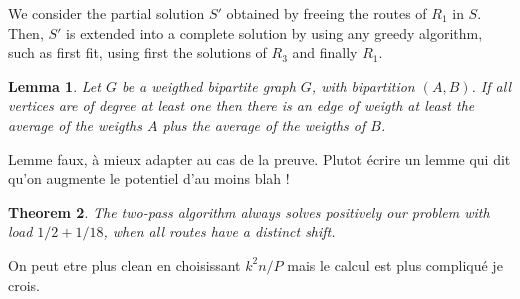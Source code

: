\documentclass[10pt, conference, letterpaper]{IEEEtran}
\newtheorem{theorem}{Theorem}
\newtheorem{lemma}[theorem]{Lemma}
\begin{document}
We consider the partial solution $S'$ obtained by freeing the routes of $R_1$ in $S$.
Then, $S'$ is extended into a complete solution by using any greedy algorithm, such as first fit, 
using first the solutions of $R_3$ and finally $R_1$.

\begin{lemma}\label{lemma:comb}
Let $G$ be a weigthed bipartite graph $G$, with bipartition $(A,B)$. 
If all vertices are of degree at least one then there is an edge of weigth
at least the average of the weigths $A$ plus the average of the weigths of $B$.
\end{lemma}
Lemme faux, à mieux adapter au cas de la preuve. Plutot écrire un lemme qui dit 
qu'on augmente le potentiel d'au moins blah !

\begin{theorem}
The two-pass algorithm always solves positively our problem with load $1/2 + 1/18$, when all routes have a distinct shift.
\end{theorem}

On peut etre plus clean en choisissant $k^2n/P$ mais le calcul est plus compliqué je crois.
\end{document}
